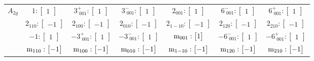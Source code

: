 \documentclass[fleqn,8pt,landscape]{jsarticle}
\begin{document}
\begin{longtable}{ccccccc}
$ A_{2g} $ & $ 1:\begin{bmatrix} 1 \end{bmatrix} $ & $ 3^{+}_{\,\,001}:\begin{bmatrix} 1 \end{bmatrix} $ & $ 3^{-}_{\,\,001}:\begin{bmatrix} 1 \end{bmatrix} $ & $ 2{}_{001}:\begin{bmatrix} 1 \end{bmatrix} $ & $ 6^{-}_{\,\,001}:\begin{bmatrix} 1 \end{bmatrix} $ & $ 6^{+}_{\,\,001}:\begin{bmatrix} 1 \end{bmatrix} $ \\
& $ 2{}_{110}:\begin{bmatrix} -1 \end{bmatrix} $ & $ 2{}_{100}:\begin{bmatrix} -1 \end{bmatrix} $ & $ 2{}_{010}:\begin{bmatrix} -1 \end{bmatrix} $ & $ 2{}_{1-10}:\begin{bmatrix} -1 \end{bmatrix} $ & $ 2{}_{120}:\begin{bmatrix} -1 \end{bmatrix} $ & $ 2{}_{210}:\begin{bmatrix} -1 \end{bmatrix} $ \\
& $ -1:\begin{bmatrix} 1 \end{bmatrix} $ & $ -3^{+}_{\,\,001}:\begin{bmatrix} 1 \end{bmatrix} $ & $ -3^{-}_{\,\,001}:\begin{bmatrix} 1 \end{bmatrix} $ & $ {\rm m}_{001}:\begin{bmatrix} 1 \end{bmatrix} $ & $ -6^{-}_{\,\,001}:\begin{bmatrix} 1 \end{bmatrix} $ & $ -6^{+}_{\,\,001}:\begin{bmatrix} 1 \end{bmatrix} $ \\
& $ {\rm m}_{110}:\begin{bmatrix} -1 \end{bmatrix} $ & $ {\rm m}_{100}:\begin{bmatrix} -1 \end{bmatrix} $ & $ {\rm m}_{010}:\begin{bmatrix} -1 \end{bmatrix} $ & $ {\rm m}_{1-10}:\begin{bmatrix} -1 \end{bmatrix} $ & $ {\rm m}_{120}:\begin{bmatrix} -1 \end{bmatrix} $ & $ {\rm m}_{210}:\begin{bmatrix} -1 \end{bmatrix} $ \\ \hline

\end{longtable}
\end{document}
